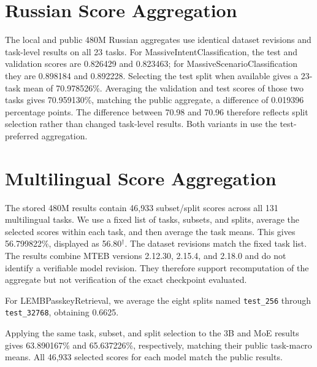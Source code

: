 \documentclass[11pt]{article}
\begin{document}
\section{Russian Score Aggregation}
\label{app:aggregation}

The local and public 480M Russian aggregates use identical dataset revisions and task-level results on all 23 tasks.
For MassiveIntentClassification, the test and validation scores are 0.826429 and 0.823463; for MassiveScenarioClassification they are 0.898184 and 0.892228.
Selecting the test split when available gives a 23-task mean of 70.978526\%.
Averaging the validation and test scores of those two tasks gives 70.959130\%, matching the public aggregate, a difference of 0.019396 percentage points.
The difference between 70.98 and 70.96 therefore reflects split selection rather than changed task-level results.
Both variants in  use the test-preferred aggregation.

\section{Multilingual Score Aggregation}
\label{app:multilingual}

The stored 480M results contain 46,933 subset/split scores across all 131 multilingual tasks.
We use a fixed list of tasks, subsets, and splits, average the selected scores within each task, and then average the task means.
This gives 56.799822\%, displayed as 56.80$^{\dagger}$.
The dataset revisions match the fixed task list.
The results combine MTEB versions 2.12.30, 2.15.4, and 2.18.0 and do not identify a verifiable model revision.
They therefore support recomputation of the aggregate but not verification of the exact checkpoint evaluated.

For LEMBPasskeyRetrieval, we average the eight splits named \texttt{test\_256} through \texttt{test\_32768}, obtaining 0.6625.

Applying the same task, subset, and split selection to the 3B and MoE results gives 63.890167\% and 65.637226\%, respectively, matching their public task-macro means.
All 46,933 selected scores for each model match the public results.
\end{document}
